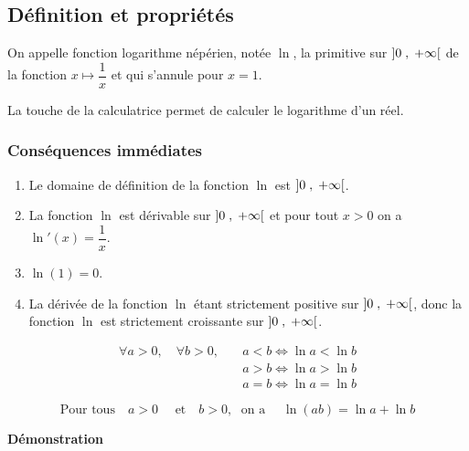 
\everymath{\displaystyle}


\subsection{Définition et propriétés}


\begin{definition}
On appelle fonction logarithme népérien,  notée $ \ln $, la primitive   sur $ \left]0 \;,\; +\infty\right[ $ de la  fonction  $ x  \longmapsto \dfrac{1}{x} $  et qui s'annule pour  $ x=1 $.

\end{definition}


La touche \fbox{$ \ln $} de la calculatrice permet de calculer le logarithme d'un réel.
 
 \subsubsection*{Conséquences immédiates}
\begin{enumerate}
\item Le domaine de définition de la fonction $ \ln $  est  $ \left]0 \;,\; +\infty\right[ $.
\item La fonction $ \ln $  est  dérivable  sur  $ \left]0 \;,\; +\infty\right[ $  et pour tout $ x> 0 $ on a   $\ln'(x)=\dfrac{1}{x} $.
\item  $\ln (1)= 0$.
\item  La dérivée de la fonction $ \ln $ étant strictement positive  sur $ \left]0 \;,\; +\infty\right[ $, donc la  fonction $ \ln $  est strictement croissante sur  $ \left]0 \;,\; +\infty\right[ $.
\end{enumerate}

\begin{property}

\begin{align*}
    \forall a > 0, \quad  \forall b > 0 ,\quad & a< b \Longleftrightarrow \ln a < \ln b \\
    & a> b \Longleftrightarrow \ln a  >\ln b  \\
    & a= b \Longleftrightarrow \ln a  =\ln b
    \end{align*} 
   \end{property}

 \begin{property}[fondamentale]
$$\text{Pour tous}\quad  a> 0 \quad  \text{ et} \quad  b>0 ,\;\text{ on a }\quad  \ln(ab)=\ln a +\ln b $$
 \end{property}
\textbf{Démonstration}

